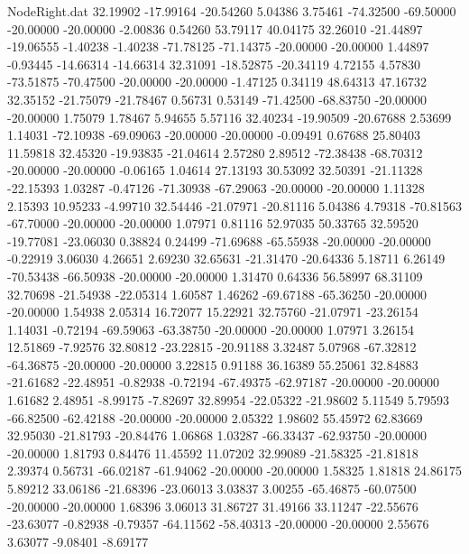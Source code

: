 \begin{filecontents}{NodeRight.dat}
  32.19902  -17.99164  -20.54260     5.04386    3.75461  -74.32500  -69.50000  -20.00000  -20.00000   -2.00836    0.54260   53.79117   40.04175
  32.26010  -21.44897  -19.06555    -1.40238   -1.40238  -71.78125  -71.14375  -20.00000  -20.00000    1.44897   -0.93445  -14.66314  -14.66314
  32.31091  -18.52875  -20.34119     4.72155    4.57830  -73.51875  -70.47500  -20.00000  -20.00000   -1.47125    0.34119   48.64313   47.16732
  32.35152  -21.75079  -21.78467     0.56731    0.53149  -71.42500  -68.83750  -20.00000  -20.00000    1.75079    1.78467    5.94655    5.57116
  32.40234  -19.90509  -20.67688     2.53699    1.14031  -72.10938  -69.09063  -20.00000  -20.00000   -0.09491    0.67688   25.80403   11.59818
  32.45320  -19.93835  -21.04614     2.57280    2.89512  -72.38438  -68.70312  -20.00000  -20.00000   -0.06165    1.04614   27.13193   30.53092
  32.50391  -21.11328  -22.15393     1.03287   -0.47126  -71.30938  -67.29063  -20.00000  -20.00000    1.11328    2.15393   10.95233   -4.99710
  32.54446  -21.07971  -20.81116     5.04386    4.79318  -70.81563  -67.70000  -20.00000  -20.00000    1.07971    0.81116   52.97035   50.33765
  32.59520  -19.77081  -23.06030     0.38824    0.24499  -71.69688  -65.55938  -20.00000  -20.00000   -0.22919    3.06030    4.26651    2.69230
  32.65631  -21.31470  -20.64336     5.18711    6.26149  -70.53438  -66.50938  -20.00000  -20.00000    1.31470    0.64336   56.58997   68.31109
  32.70698  -21.54938  -22.05314     1.60587    1.46262  -69.67188  -65.36250  -20.00000  -20.00000    1.54938    2.05314   16.72077   15.22921
  32.75760  -21.07971  -23.26154     1.14031   -0.72194  -69.59063  -63.38750  -20.00000  -20.00000    1.07971    3.26154   12.51869   -7.92576
  32.80812  -23.22815  -20.91188     3.32487    5.07968  -67.32812  -64.36875  -20.00000  -20.00000    3.22815    0.91188   36.16389   55.25061
  32.84883  -21.61682  -22.48951    -0.82938   -0.72194  -67.49375  -62.97187  -20.00000  -20.00000    1.61682    2.48951   -8.99175   -7.82697
  32.89954  -22.05322  -21.98602     5.11549    5.79593  -66.82500  -62.42188  -20.00000  -20.00000    2.05322    1.98602   55.45972   62.83669
  32.95030  -21.81793  -20.84476     1.06868    1.03287  -66.33437  -62.93750  -20.00000  -20.00000    1.81793    0.84476   11.45592   11.07202
  32.99089  -21.58325  -21.81818     2.39374    0.56731  -66.02187  -61.94062  -20.00000  -20.00000    1.58325    1.81818   24.86175    5.89212
  33.06186  -21.68396  -23.06013     3.03837    3.00255  -65.46875  -60.07500  -20.00000  -20.00000    1.68396    3.06013   31.86727   31.49166
  33.11247  -22.55676  -23.63077    -0.82938   -0.79357  -64.11562  -58.40313  -20.00000  -20.00000    2.55676    3.63077   -9.08401   -8.69177

\end{filecontents}
